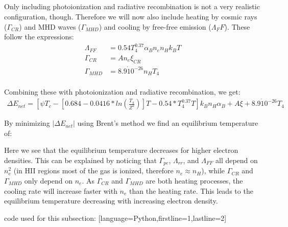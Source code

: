 \subsection{}
Only including photoionization and radiative recombination is not a very realistic configuration, though.
Therefore we will now also include heating by cosmic rays ($\Gamma_{CR}$) and MHD waves ($\Gamma_{MHD}$) and cooling by free-free emission ($\Lambda_FF$).
These follow the expressions:
\begin{align} 
    \Lambda_{FF} &= 0.54 T^{0.37}_4 \alpha_B n_e n_H k_B T \\
    \Gamma_{CR} &= A n_e \xi_{CR} \\
    \Gamma_{MHD} &= 8.9\dot10^{-26} n_H T_4\\
\end{align}

Combining these with photoionization and radiative recombination, we get:
\begin{align}
    \Delta E_{net} = \left[ \psi T_c - \left[ 0.684 - 0.0416 * ln\left( \frac{T_4}{Z^2} \right)\right] T - 0.54 * T_4^{0.37} T\right] k_B n_H \alpha_B + A \xi + 8.9\dot10^{-26} T_4
\end{align}

By minimizing $| \Delta E_{net} |$ using Brent's method we find an equilibrium temperature of:


Here we see that the equilibrium temperature decreases for higher electron densities.
This can be explained by noticing that $\Gamma_{pe}$, $\Lambda_{rr}$, and $\Lambda_{FF}$ all depend on $n_e^2$ 
(in HII regions most of the gas is ionized, therefore $n_e \approx n_H$), while $\Gamma_{CR}$ and $\Gamma_{MHD}$ only depend on $n_e$.
As $\Gamma_{CR}$ and $\Gamma_{MHD}$ are both heating processes, the cooling rate will increase faster with $n_e$ than the heating rate.
This leads to the equilibrium temperature decreasing with increasing electron density.

code used for this subsection:
[language=Python,firstline=1,lastline=2]